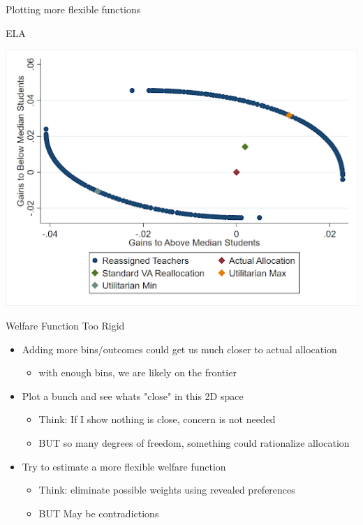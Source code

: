 \documentclass[t,aspectratio=169,11pt,presentation]{beamer}
\begin{document}
    \begin{frame}{Plotting more flexible functions}
    
        \centering
    
        \begin{center}
            ELA
        \end{center}
            \includegraphics[width=.6\textwidth]{figures/ELA_reallocations.png}
    
    \end{frame}
    


    \begin{frame}{Welfare Function Too Rigid}
    
    \begin{itemize}
        \item Adding more bins/outcomes could get us much closer to actual allocation %
        \begin{itemize}
            \item with enough bins, we are likely on the frontier 
        \end{itemize}
        
        \item Plot a bunch and see whats "close" in this 2D space 
        \begin{itemize}
            \item Think: If I show nothing is close, concern is not needed
            \item BUT so many degrees of freedom, something could rationalize allocation
        \end{itemize}
        
        \item Try to estimate a more flexible welfare function
        \begin{itemize}
            \item Think: eliminate possible weights using revealed preferences 
            \item BUT May be contradictions 
        \end{itemize}

    \end{itemize}    
    \end{frame}
    
\end{document}
